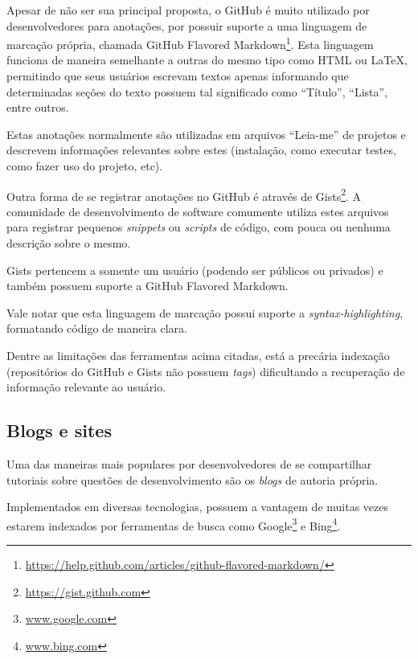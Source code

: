 Apesar de não ser sua principal proposta, o GitHub é muito utilizado por desenvolvedores para anotações, por possuir suporte a uma linguagem de marcação própria, chamada GitHub Flavored Markdown\footnote{\url{https://help.github.com/articles/github-flavored-markdown/}}. Esta linguagem funciona de maneira semelhante a outras do mesmo tipo como HTML ou LaTeX, permitindo que seus usuários escrevam textos apenas informando que determinadas seções do texto possuem tal significado como ``Título'', ``Lista'', entre outros.

Estas anotações normalmente são utilizadas em arquivos ``Leia-me'' de projetos e descrevem informações relevantes sobre estes (instalação, como executar testes, como fazer uso do projeto, etc).


Outra forma de se registrar anotações no GitHub é através de Gists\footnote{\url{https://gist.github.com}}. A comunidade de desenvolvimento de software comumente utiliza estes arquivos para registrar pequenos \textit{snippets} ou \textit{scripts} de código, com pouca ou nenhuma descrição sobre o mesmo.

Gists pertencem a somente um usuário (podendo ser públicos ou privados) e também possuem suporte a GitHub Flavored Markdown.

Vale notar que esta linguagem de marcação possui suporte a \textit{syntax-highlighting}, formatando código de maneira clara.


Dentre as limitações das ferramentas acima citadas, está a precária indexação (repositórios do GitHub e Gists não possuem \textit{tags}) dificultando a recuperação de informação relevante ao usuário.


\subsection{Blogs e sites}

Uma das maneiras mais populares por desenvolvedores de se compartilhar tutoriais sobre questões de desenvolvimento são os \textit{blogs} de autoria própria.

Implementados em diversas tecnologias, possuem a vantagem de muitas vezes estarem indexados por ferramentas de busca como Google\footnote{\url{www.google.com}} e Bing\footnote{\url{www.bing.com}}.


